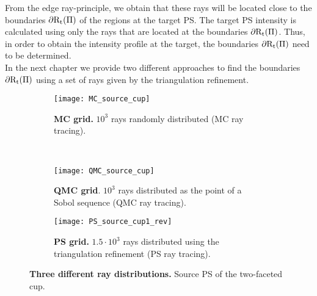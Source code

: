 From the edge ray-principle, we obtain that these rays will be located close to the boundaries $\partial\mbox{$\textup{R}$}_\textrm{t}(\Pi)$ of the regions at the target PS. The target PS intensity is calculated using only the rays that are located at the boundaries $\partial\mbox{$\textup{R}$}_\textrm{t}(\Pi)$. Thus, in order to obtain the intensity profile at the target, the boundaries $\partial\mbox{$\textup{R}$}_\textrm{t}(\Pi)$ need to be determined.\\ \indent 
In the next chapter we provide two different approaches to find the boundaries $\partial\mbox{$\textup{R}$}_\textrm{t}(\Pi)$ using a set of rays given by the triangulation refinement.
\begin{figure}[h]
 \begin{subfigure}[t]{\textwidth}
\centering
    \texttt{[image: MC\_source\_cup]}
    \caption{\textbf{MC grid.} $10^3$ rays randomly distributed (MC ray tracing).}
    \label{fig:mc_sample}
\end{subfigure}
\hfill
\\
\begin{subfigure}[t]{\textwidth}
\centering
    \texttt{[image: QMC\_source\_cup]}
    \caption{\textbf{QMC grid}. $10^3$ rays distributed as the point of a Sobol sequence (QMC ray tracing).}
    \label{fig:qmc_sample}
\end{subfigure}
\hfill
\begin{subfigure}[t]{\textwidth}
\centering
\texttt{[image: PS\_source\_cup1\_rev]}
\caption{\textbf{PS grid.} $1.5\cdot10^3$ rays distributed using the triangulation refinement (PS ray tracing).}
\label{fig:ps_sample}
\end{subfigure}
\caption{\textbf{Three different ray distributions.} Source PS of the two-faceted cup.}
\label{fig:three_distributions}
\end{figure}

